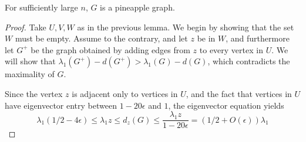 \begin{theorem}
For sufficiently large $n$, $G$ is a pineapple graph.
\end{theorem}
\begin{proof}
Take $U,V,W$ as in the previous lemma.  We begin by showing that the set $W$ must be empty.  Assume to the contrary, and let $z$ be in $W$, and furthermore
let $G^+$ be the graph obtained by adding edges from $z$ to every vertex in $U$.
We will show that $\lambda_1(G^+) - d(G^+) > \lambda_1(G) - d(G)$, which contradicts the maximality of $G$.

Since the vertex $z$ is adjacent only to vertices in $U$, and the
fact that vertices in $U$ have eigenvector entry between $1-20\epsilon$ and $1$,
the eigenvector equation yields
 \[\lambda_1 (1/2 - 4 \epsilon) \leq \lambda_1 z \leq d_z(G) \leq \frac{\lambda_1 z}{1 - 20 \epsilon} = (1/2 + O(\epsilon))\lambda_1\]


\end{proof}
